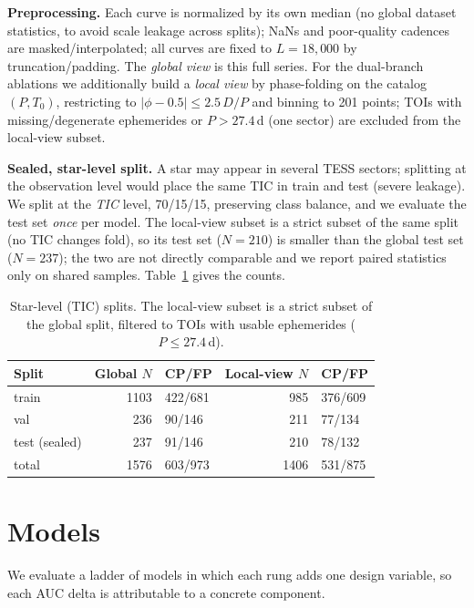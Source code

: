 \documentclass[conference]{IEEEtran}
\begin{document}
\textbf{Preprocessing.} Each curve is normalized by its own median (no global
dataset statistics, to avoid scale leakage across splits); NaNs and
poor-quality cadences are masked/interpolated; all curves are fixed to
$L=18{,}000$ by truncation/padding. The \emph{global view} is this full series.
For the dual-branch ablations we additionally build a \emph{local view} by
phase-folding on the catalog $(P, T_0)$, restricting to $|\phi-0.5|\le 2.5\,D/P$
and binning to 201 points; TOIs with missing/degenerate ephemerides or
$P>27.4$\,d (one sector) are excluded from the local-view subset.

\textbf{Sealed, star-level split.} A star may appear in several TESS sectors;
splitting at the observation level would place the same TIC in train and test
(severe leakage). We split at the \emph{TIC} level, 70/15/15, preserving class
balance, and we evaluate the test set \emph{once} per model. The local-view
subset is a strict subset of the same split (no TIC changes fold), so its
test set ($N=210$) is smaller than the global test set ($N=237$); the two are not
directly comparable and we report paired statistics only on shared samples.
Table~\ref{tab:splits} gives the counts.

\begin{table}[!t]
\caption{Star-level (TIC) splits. The local-view subset is a strict subset of the
global split, filtered to TOIs with usable ephemerides ($P\le27.4$\,d).}
\label{tab:splits}
\centering
\footnotesize
\begin{tabular}{lrlrl}
\toprule
Split & Global $N$ & CP/FP & Local-view $N$ & CP/FP \\
\midrule
train & 1103 & 422/681 & 985 & 376/609 \\
val   & 236  & 90/146  & 211 & 77/134 \\
test (sealed) & 237 & 91/146 & 210 & 78/132 \\
\midrule
total & 1576 & 603/973 & 1406 & 531/875 \\
\bottomrule
\end{tabular}
\end{table}

\section{Models}

We evaluate a ladder of models in which each rung adds one design variable, so
each AUC delta is attributable to a concrete component.
\end{document}
